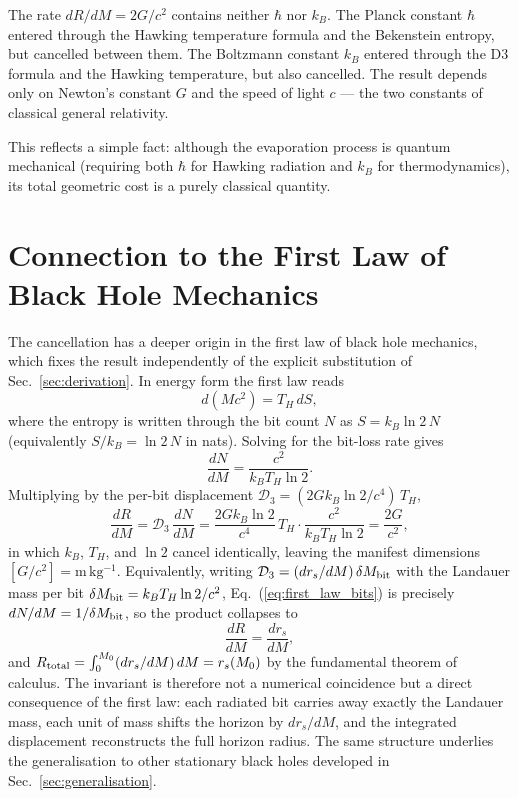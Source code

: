\documentclass[aps,prd,twocolumn,showpacs,preprintnumbers,amsmath,amssymb,longbibliography]{revtex4-2}
\begin{document}
The rate $dR/dM = 2G/c^2$ contains neither $\hbar$ nor $k_B$. 
The Planck constant $\hbar$ entered through the Hawking temperature formula and 
the Bekenstein entropy, but cancelled between them. The Boltzmann constant $k_B$ 
entered through the D3 formula and the Hawking temperature, but also cancelled. 
The result depends only on Newton's constant $G$ and the speed of light $c$ --- 
the two constants of classical general relativity.

This reflects a simple fact: although the evaporation process is quantum 
mechanical (requiring both $\hbar$ for Hawking radiation and $k_B$ for 
thermodynamics), its total geometric cost is a purely classical quantity.

\section{Connection to the First Law of Black Hole Mechanics}
\label{sec:first_law}

The cancellation has a deeper origin in the first law of black hole
mechanics, which fixes the result independently of the explicit substitution of
Sec.~\ref{sec:derivation}. In energy form the first law reads
\begin{equation}
d(Mc^2) = T_H\, dS,
\label{eq:first_law}
\end{equation}
where the entropy is written through the bit count $N$ as $S = k_B \ln 2\, N$
(equivalently $S/k_B = \ln 2\, N$ in nats). Solving for the bit-loss rate gives
\begin{equation}
\frac{dN}{dM} = \frac{c^2}{k_B T_H \ln 2}.
\label{eq:first_law_bits}
\end{equation}
Multiplying by the per-bit displacement $\mathcal{D}_3 = (2G k_B \ln 2/c^4)\,T_H$,
\begin{equation}
\frac{dR}{dM} = \mathcal{D}_3\,\frac{dN}{dM}
= \frac{2G k_B \ln 2}{c^4}\,T_H \cdot \frac{c^2}{k_B T_H \ln 2}
= \frac{2G}{c^2},
\label{eq:first_law_derivation}
\end{equation}
in which $k_B$, $T_H$, and $\ln 2$ cancel identically, leaving the manifest
dimensions $[G/c^2]=\mathrm{m\,kg^{-1}}$. Equivalently, writing
$\mathcal{D}_3 = (dr_s/dM)\,\delta M_{\rm bit}$ with the Landauer mass per bit
$\delta M_{\rm bit} = k_B T_H \ln 2/c^2$, Eq.~(\ref{eq:first_law_bits}) is
precisely $dN/dM = 1/\delta M_{\rm bit}$, so the product collapses to
\begin{equation}
\frac{dR}{dM} = \frac{dr_s}{dM},
\label{eq:dRdM_drsdM}
\end{equation}
and $R_{\rm total} = \int_0^{M_0}(dr_s/dM)\,dM = r_s(M_0)$ by the fundamental
theorem of calculus. The invariant is therefore not a numerical coincidence but
a direct consequence of the first law: each radiated bit carries away exactly
the Landauer mass, each unit of mass shifts the horizon by $dr_s/dM$, and the
integrated displacement reconstructs the full horizon radius. The same
structure underlies the generalisation to other stationary black holes
developed in Sec.~\ref{sec:generalisation}.
\end{document}
